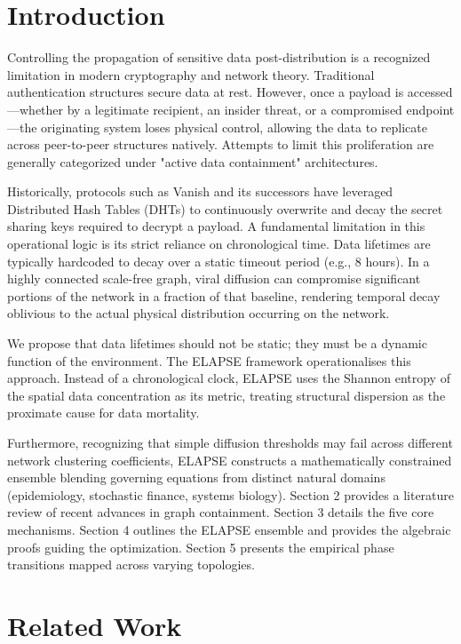 \documentclass[review,12pt]{elsarticle}
\begin{document}
\section{Introduction}
\label{sec:intro}

Controlling the propagation of sensitive data post-distribution is a recognized limitation in modern cryptography and network theory. Traditional authentication structures secure data at rest. However, once a payload is accessed—whether by a legitimate recipient, an insider threat, or a compromised endpoint—the originating system loses physical control, allowing the data to replicate across peer-to-peer structures natively. Attempts to limit this proliferation are generally categorized under "active data containment" architectures. 

Historically, protocols such as Vanish \cite{geambasu2009vanish} and its successors \cite{tang2010fades} have leveraged Distributed Hash Tables (DHTs) to continuously overwrite and decay the secret sharing keys required to decrypt a payload. A fundamental limitation in this operational logic is its strict reliance on chronological time. Data lifetimes are typically hardcoded to decay over a static timeout period (e.g., 8 hours). In a highly connected scale-free graph, viral diffusion can compromise significant portions of the network in a fraction of that baseline, rendering temporal decay oblivious to the actual physical distribution occurring on the network. 

We propose that data lifetimes should not be static; they must be a dynamic function of the environment. The ELAPSE framework operationalises this approach. Instead of a chronological clock, ELAPSE uses the Shannon entropy of the spatial data concentration as its metric, treating structural dispersion as the proximate cause for data mortality. 

Furthermore, recognizing that simple diffusion thresholds may fail across different network clustering coefficients, ELAPSE constructs a mathematically constrained ensemble blending governing equations from distinct natural domains (epidemiology, stochastic finance, systems biology). Section 2 provides a literature review of recent advances in graph containment. Section 3 details the five core mechanisms. Section 4 outlines the ELAPSE ensemble and provides the algebraic proofs guiding the optimization. Section 5 presents the empirical phase transitions mapped across varying topologies.

\section{Related Work}
\label{sec:background}
\end{document}
